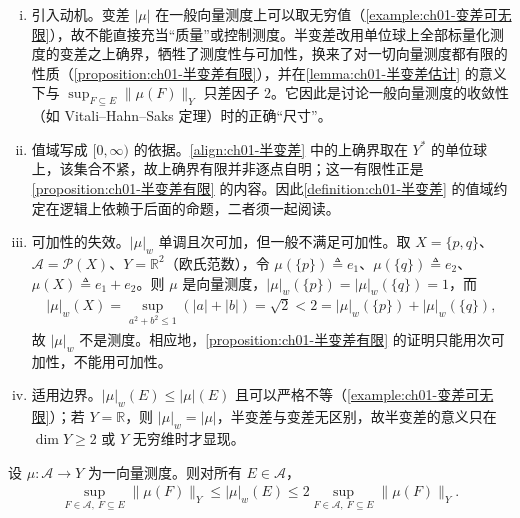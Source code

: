 \documentclass[../../main.tex]{subfiles}%
\begin{document}
\begin{remark}\label{remark:ch01-半变差动机}
\begin{enumerate}[(i)]
\item 引入动机。变差 $|\mu|$ 在一般向量测度上可以取无穷值（\cref{example:ch01-变差可无限}），故不能直接充当“质量”或控制测度。半变差改用单位球上全部标量化测度的变差之上确界，牺牲了测度性与可加性，换来了对一切向量测度都有限的性质（\cref{proposition:ch01-半变差有限}），并在\cref{lemma:ch01-半变差估计} 的意义下与 $\sup_{F\subseteq E}\|\mu(F)\|_Y$ 只差因子 $2$。它因此是讨论一般向量测度的收敛性（如 Vitali--Hahn--Saks 定理）时的正确“尺寸”。
\item 值域写成 $[0,\infty)$ 的依据。\eqref{align:ch01-半变差} 中的上确界取在 $Y^*$ 的单位球上，该集合不紧，故上确界有限并非逐点自明；这一有限性正是\cref{proposition:ch01-半变差有限} 的内容。因此\cref{definition:ch01-半变差} 的值域约定在逻辑上依赖于后面的命题，二者须一起阅读。
\item 可加性的失效。$|\mu|_w$ 单调且次可加，但一般不满足可加性。取 $X=\{p,q\}$、$\mathcal{A}=\mathcal{P}(X)$、$Y=\mathbb{R}^2$（欧氏范数），令 $\mu(\{p\})\triangleq e_1$、$\mu(\{q\})\triangleq e_2$、$\mu(X)\triangleq e_1+e_2$。则 $\mu$ 是向量测度，$|\mu|_w(\{p\})=|\mu|_w(\{q\})=1$，而
\begin{align*}
|\mu|_w(X)=\sup_{a^2+b^2\leqslant1}\left(|a|+|b|\right)=\sqrt2<2=|\mu|_w(\{p\})+|\mu|_w(\{q\}),
\end{align*}
故 $|\mu|_w$ 不是测度。相应地，\cref{proposition:ch01-半变差有限} 的证明只能用次可加性，不能用可加性。
\item 适用边界。$|\mu|_w(E)\leqslant|\mu|(E)$ 且可以严格不等（\cref{example:ch01-变差可无限}）；若 $Y=\mathbb{R}$，则 $|\mu|_w=|\mu|$，半变差与变差无区别，故半变差的意义只在 $\dim Y\geqslant2$ 或 $Y$ 无穷维时才显现。
\end{enumerate}
\end{remark}

\begin{lemma}\label{lemma:ch01-半变差估计}
设 $\mu:\mathcal{A}\to Y$ 为一向量测度。则对所有 $E\in\mathcal{A}$，
\begin{align}
\sup_{F\in\mathcal{A},\ F\subseteq E}\|\mu(F)\|_Y
\leqslant|\mu|_w(E)
\leqslant 2\sup_{F\in\mathcal{A},\ F\subseteq E}\|\mu(F)\|_Y. \label{align:ch01-半变差估计}
\end{align}
\end{lemma}
\end{document}
